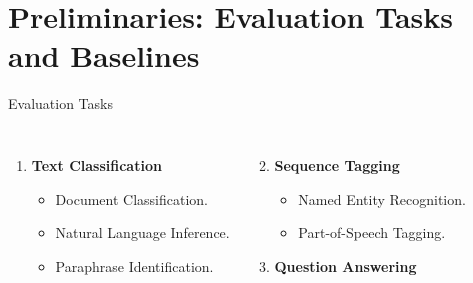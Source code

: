 \documentclass[aspectratio=169,xcolor=dvipsnames]{beamer}
\begin{document}
\section{Preliminaries: Evaluation Tasks and Baselines}
\begin{frame}{Evaluation Tasks}

\begin{columns}[c] %

\begin{enumerate}
    \item \textbf{Text Classification}
    \begin{itemize}
        \item Document Classification.
        \item Natural Language Inference.
        \item Paraphrase Identification.
    \end{itemize}
\end{enumerate}

\begin{enumerate}
    \setcounter{enumi}{1}
    \item \textbf{Sequence Tagging}
    \begin{itemize}
        \item Named Entity Recognition.
        \item Part-of-Speech Tagging.
    \end{itemize}
    \item \textbf{Question Answering}
\end{enumerate}

\end{columns}


\end{frame}
\end{document}

